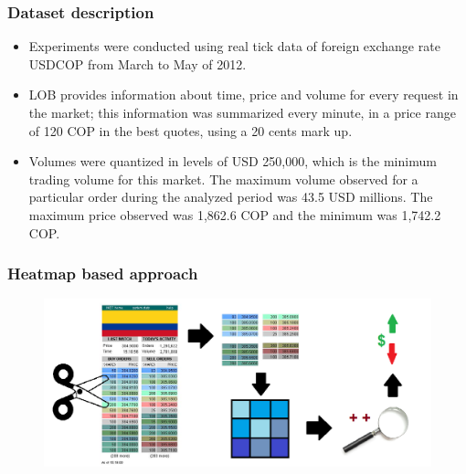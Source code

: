 \documentclass{beamer}
\begin{document}
\begin{frame}
\frametitle{Dataset description}
\begin{itemize}
	\item Experiments were conducted using real tick data of foreign exchange rate USDCOP from March to May of 2012.
	\item LOB provides information about time, price and volume for every request in the market; this information was summarized every minute, in a price range of 120 COP in the best quotes, using a 20 cents mark up. 
	\item Volumes were quantized in levels of USD 250,000, which is the minimum trading volume for this market. The maximum volume observed for a particular order during the analyzed period was 43.5 USD millions. The maximum price observed was 1,862.6 COP and the minimum was 1,742.2 COP. 
\end{itemize}
 
\end{frame}

\begin{frame}
\frametitle{Heatmap based approach}

\begin{figure}
	\centering
		\includegraphics[scale=0.3]{Methodology1.png}
	\label{fig:Methodology1}
\end{figure}

\end{frame}
\end{document}
